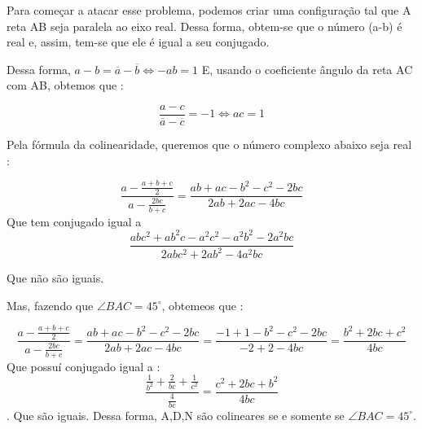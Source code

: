 \documentclass{article}
\begin{document}
\begin{center}

\end{center}

Para começar a atacar esse problema, podemos criar uma configuração tal que A reta AB seja paralela ao eixo real. Dessa forma, obtem-se que o número (a-b) é real e, assim, tem-se que ele é igual a seu conjugado.

Dessa forma, $a - b = \overline{a} - \overline{b} \iff -ab = 1$
E, usando o coeficiente ângulo da reta AC com AB, obtemos que :

$$\frac{a-c}{\overline{a}-\overline{c}} = -1 \iff ac = 1$$

Pela fórmula da colinearidade, queremos que o número complexo abaixo seja real : 

$$\frac{a - \frac{a+b+c}{2}}{a - \frac{2bc}{b+c}} = \frac{ab + ac -b^2 -c^2 - 2bc}{2ab + 2ac - 4bc}$$
Que tem conjugado igual a 
$$\frac{abc^2 + ab^ 2 c - a^2c^2 -a^2b^2 -2a^2bc}{2abc^2 + 2ab^2 - 4a^2bc}$$

Que não são iguais.

Mas, fazendo que $\angle BAC = 45^{\circ}$, obtemeos que : 

$$\frac{a - \frac{a+b+c}{2}}{a - \frac{2bc}{b+c}} = \frac{ab + ac -b^2 -c^2 - 2bc}{2ab + 2ac - 4bc} = \frac{-1+1-b^2 -c^2 -2bc}{-2+2 - 4bc}= \frac{b^2 + 2bc + c^2}{4bc}$$
Que possuí conjugado igual a : 
$$\frac{\frac{1}{b^2} + \frac{2}{bc} + \frac{1}{c^2}}{\frac{4}{bc}} = \frac{c^2 + 2bc + b^2}{4bc}$$. Que são iguais. Dessa forma, A,D,N são colineares se e somente se $\angle BAC = 45^{\circ}$.
\end{document}
